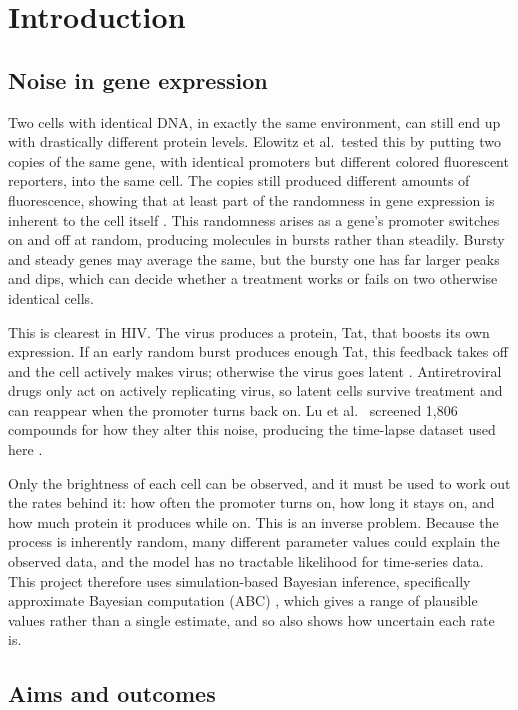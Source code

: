 \chapter{Introduction}\label{ch:intro}

\section{Noise in gene expression}\label{sec:intro-noise}

Two cells with identical DNA, in exactly the same environment, can still end up with drastically different protein levels. Elowitz et al.\ tested this by putting two copies of the same gene, with identical promoters but different colored fluorescent reporters, into the same cell. The copies still produced different amounts of fluorescence, showing that at least part of the randomness in gene expression is inherent to the cell itself \cite{elowitz2002}. This randomness arises as a gene's promoter switches on and off at random, producing molecules in bursts rather than steadily. Bursty and steady genes may average the same, but the bursty one has far larger peaks and dips, which can decide whether a treatment works or fails on two otherwise identical cells.

This is clearest in HIV. The virus produces a protein, Tat, that boosts its own expression. If an early random burst produces enough Tat, this feedback takes off and the cell actively makes virus; otherwise the virus goes latent \cite{weinberger2005}. Antiretroviral drugs only act on actively replicating virus, so latent cells survive treatment and can reappear when the promoter turns back on. Lu et al.\ \cite{lu2021} screened 1,806 compounds for how they alter this noise, producing the time-lapse dataset used here \cite{idb_dataset}.

Only the brightness of each cell can be observed, and it must be used to work out the rates behind it: how often the promoter turns on, how long it stays on, and how much protein it produces while on. This is an inverse problem. Because the process is inherently random, many different parameter values could explain the observed data, and the model has no tractable likelihood for time-series data. This project therefore uses simulation-based Bayesian inference, specifically approximate Bayesian computation (ABC) \cite{beaumont2002}, which gives a range of plausible values rather than a single estimate, and so also shows how uncertain each rate is.

\section{Aims and outcomes}\label{sec:intro-aims}

